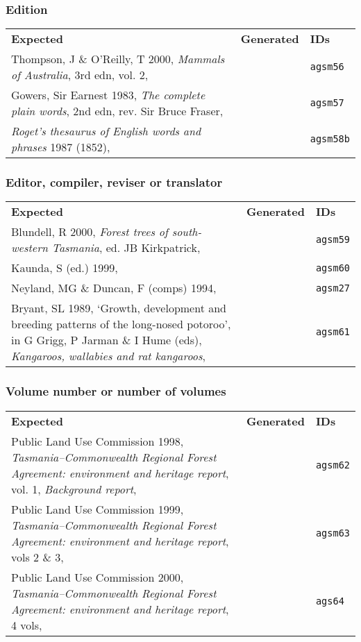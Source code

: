 \documentclass[a4paper,landscape,12pt]{article}
\newlength\q
\newlength\qr
\newenvironment{citetable}
  {\noindent\begin{longtable}{p{\q} p{\q} p{\qr}}\textbf{Expected} & \textbf{Generated} & \textbf{IDs}\\}
  {\end{longtable}}
\newcommand{\majorissue}[1]{\textcolor{red}{#1}}
\newcommand{\minorissue}[1]{\textcolor{blue}{#1}}
\begin{document}
\subsubsection{Edition}

\begin{citetable}
	Thompson, J \& O'Reilly, T 2000, \textit{Mammals of Australia}, 3rd edn, vol. 2, & \fullcite{agsm56} & \texttt{agsm56} \\
	Gowers, Sir Earnest 1983, \textit{The complete plain words}, 2nd edn, rev. Sir Bruce Fraser, & \fullcite{agsm57} & \texttt{agsm57} \\
	\textit{Roget's thesaurus of English words and phrases} 1987 (1852), & \majorissue{\fullcite{agsm58b}} & \texttt{agsm58b} \\
\end{citetable}

\subsubsection{Editor, compiler, reviser or translator}

\begin{citetable}
	Blundell, R 2000, \textit{Forest trees of south-western Tasmania}, ed. JB Kirkpatrick, & \fullcite{agsm59} & \texttt{agsm59} \\
	Kaunda, S (ed.) 1999, & \fullcite{agsm60} & \texttt{agsm60} \\
	Neyland, MG \& Duncan, F (comps) 1994, & \fullcite{agsm27} & \texttt{agsm27} \\
	Bryant, SL 1989, `Growth, development and breeding patterns of the long-nosed potoroo', in G Grigg, P Jarman \& I Hume (eds), \textit{Kangaroos, wallabies and rat kangaroos}, & \fullcite{agsm61} & \texttt{agsm61} \\
\end{citetable}

\subsubsection{Volume number or number of volumes}

\begin{citetable}
	Public Land Use Commission 1998, \textit{Tasmania--Commonwealth Regional Forest Agreement: environment and heritage report}, vol. 1, \textit{Background report}, & \fullcite{agsm62} & \texttt{agsm62} \\
	Public Land Use Commission 1999, \textit{Tasmania--Commonwealth Regional Forest Agreement: environment and heritage report}, vols 2 \& 3, & \minorissue{\fullcite{agsm63}} & \texttt{agsm63} \\
	Public Land Use Commission 2000, \textit{Tasmania--Commonwealth Regional Forest Agreement: environment and heritage report}, 4 vols, & \fullcite{agsm64} & \texttt{ags64} \\
\end{citetable}
\end{document}
